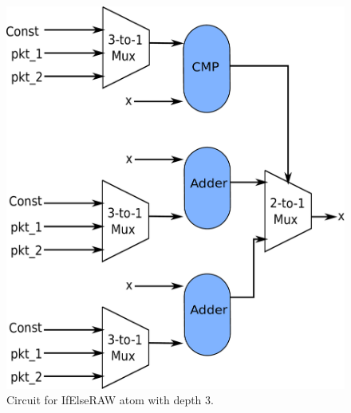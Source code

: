 \begin{figure}[!htbp]
  \includegraphics[width=\columnwidth]{if_else.pdf}
  \caption{Circuit for IfElseRAW atom with depth 3.}
  \label{fig:ifelseraw}
\end{figure}

\FloatBarrier

